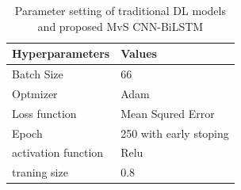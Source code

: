 \documentclass[a4paper, fleqn]{cas-sc}
\theoremstyle{definition}
\theoremstyle{remark}
\begin{document}
\begin{table}[h!]
  \caption{Parameter setting of traditional DL models and proposed MvS CNN-BiLSTM }
  \label{tab: my-table}
  \begin{tabular}{ll}
  \hline Hyperparameters & Values        \\ \hline
  Batch Size               & 66                     \\
  Optmizer                 & Adam                   \\
  Loss function            & Mean Squred Error      \\
  Epoch                    & 250 with early stoping \\
  activation function      & Relu                   \\
  traning size             & 0.8                   \\ \hline
  \end{tabular}
  \end{table}
\end{document}
